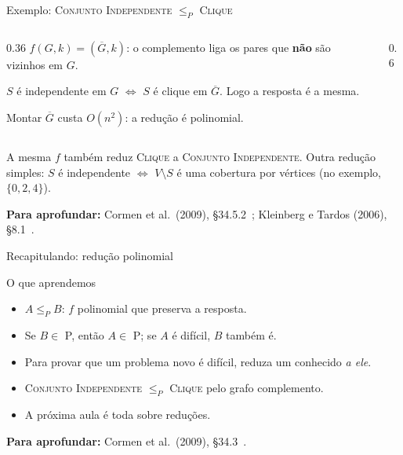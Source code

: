 \documentclass[aspectratio=169,xcolor=table]{beamer}
\newcommand{\arestashexa}{0/1, 1/2, 2/3, 3/4, 4/5, 5/0, 0/2}
\newcommand{\noshexa}{%
  \foreach \i in {0,...,5} \node[vert] (h\i) at ({90+60*\i}:0.95) {\i};
}
\newcommand{\hexa}[2]{%
  \noshexa
  \def\listaA{#2}\ifx\listaA\empty\else
    \foreach \u/\v in {#2} \draw[ares] (h\u) -- (h\v);\fi
  \foreach \u/\v in \arestashexa \draw[aresta] (h\u) -- (h\v);
  \def\listaV{#1}\ifx\listaV\empty\else
    \foreach \v in {#1} \node[vS] at (h\v) {\v};\fi
}
\newcommand{\arestascomp}{0/3, 0/4, 1/3, 1/4, 1/5, 2/4, 2/5, 3/5}
\newcommand{\hexacomp}[2]{%
  \noshexa
  \def\listaA{#2}\ifx\listaA\empty\else
    \foreach \u/\v in {#2} \draw[ares] (h\u) -- (h\v);\fi
  \foreach \u/\v in \arestascomp \draw[aresta] (h\u) -- (h\v);
  \def\listaV{#1}\ifx\listaV\empty\else
    \foreach \v in {#1} \node[vS] at (h\v) {\v};\fi
}
\newcommand{\fonte}[1]{%
  \vfill
  {\tiny\color{gray!55!black}\textbf{Para aprofundar:} #1\par}%
}
\newcommand{\prob}[1]{\textsc{#1}}
\begin{document}
\begin{frame}{Exemplo: \prob{Conjunto Independente} $\le_P$ \prob{Clique}}
  \begin{columns}[c]
    \begin{column}{0.36\textwidth}
      \scriptsize
      $f(G, k) = (\overline{G}, k)$: o complemento liga os pares que \textbf{não} são vizinhos
      em $G$.
      \medskip

      $S$ é independente em $G$ $\iff$ $S$ é clique em $\overline{G}$. Logo a resposta é a
      mesma.
      \medskip

      Montar $\overline{G}$ custa $O(n^2)$: a redução é polinomial.
    \end{column}
    \begin{column}{0.6\textwidth}
      \begin{center}
      \end{center}
    \end{column}
  \end{columns}
  \scriptsize
  A mesma $f$ também reduz \prob{Clique} a \prob{Conjunto Independente}. Outra redução
  simples: $S$ é independente $\iff$ $V \setminus S$ é uma cobertura por vértices
  (no exemplo, $\{0,2,4\}$).
  \fonte{Cormen et al.\ (2009), \S 34.5.2~\cite{cormen2009introduction};
    Kleinberg e Tardos (2006), \S 8.1~\cite{kleinberg2006algorithm}.}
\end{frame}

\begin{frame}{Recapitulando: redução polinomial}
  \begin{block}{O que aprendemos}
    \begin{itemize}
      \item $A \le_P B$: $f$ polinomial que preserva a resposta.
      \item Se $B \in$ P, então $A \in$ P; se $A$ é difícil, $B$ também é.
      \item Para provar que um problema novo é difícil, reduza um conhecido \emph{a ele}.
      \item \prob{Conjunto Independente} $\le_P$ \prob{Clique} pelo grafo complemento.
      \item A próxima aula é toda sobre reduções.
    \end{itemize}
  \end{block}
  \fonte{Cormen et al.\ (2009), \S 34.3~\cite{cormen2009introduction}.}
\end{frame}
\end{document}
